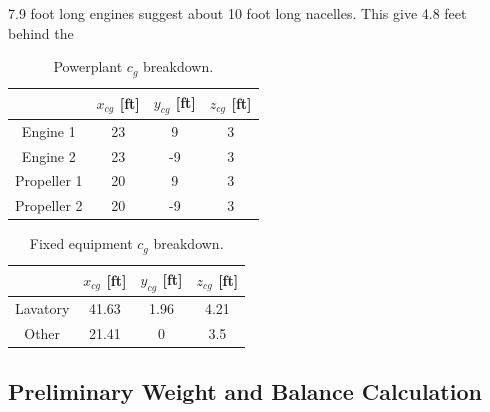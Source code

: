 \documentclass[conf]{new-aiaa}
\begin{document}
7.9 foot long engines suggest about 10 foot long nacelles. This give 4.8 feet behind the 

\begin{table}[H]
\centering
\label{tab:Powerplant cg}
\caption{Powerplant $c_g$ breakdown.}
\begin{tabular}{|c|c|c|c|}\hline
	& $x_{cg}$ [ft] & $y_{cg}$ [ft] & $z_{cg}$ [ft] \\ \hline
Engine 1 & 23 & 9 & 3\\ \hline
Engine 2 & 23 & -9 & 3\\ \hline
Propeller 1 & 20 & 9 & 3 \\ \hline
Propeller 2 & 20 & -9 & 3\\ \hline
\end{tabular}
\end{table}

\begin{table}[H]
\centering
\label{tab:Fixed equipment cg}
\caption{Fixed equipment $c_g$ breakdown.}
\begin{tabular}{|c|c|c|c|}\hline
	& $x_{cg}$ [ft] & $y_{cg}$ [ft] & $z_{cg}$ [ft] \\ \hline
Lavatory & 41.63 & 1.96 & 4.21\\ \hline
Other & 21.41 & 0 & 3.5\\ \hline

\end{tabular}
\end{table}




\subsection{Preliminary Weight and Balance Calculation}
\end{document}
